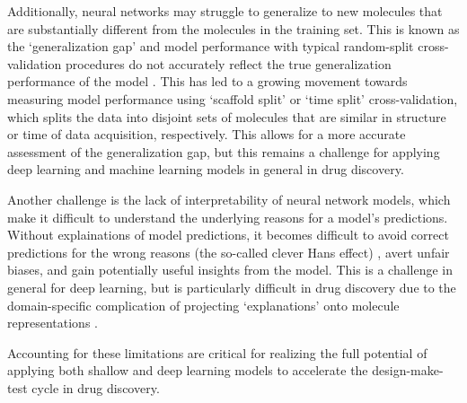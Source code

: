 Additionally, neural networks may struggle to generalize to new molecules that are substantially different from the molecules in the training set. This is known as the `generalization gap' and model performance with typical random-split cross-validation procedures do not accurately reflect the true generalization performance of the model \cite{Sheridan2013TimeSplit}. This has led to a growing movement towards measuring model performance using `scaffold split' \cite{wu2017molnet, yang2019chemprop} or `time split' \cite{Sheridan2013TimeSplit} cross-validation, which splits the data into disjoint sets of molecules that are similar in structure or time of data acquisition, respectively. This allows for a more accurate assessment of the generalization gap, but this remains a challenge for applying deep learning and machine learning models in general in drug discovery.

Another challenge is the lack of interpretability of neural network models, which make it difficult to understand the underlying reasons for a model's predictions. Without explainations of model predictions, it becomes difficult to avoid correct predictions for the wrong reasons (the so-called clever Hans effect) \cite{Lapuschkin2019UnmaskingCleverHans}, avert unfair biases, and gain potentially useful insights from the model. This is a challenge in general for deep learning, but is particularly difficult in drug discovery due to the domain-specific complication of projecting `explanations' onto molecule representations \cite{Jimenze2020XAI}.

Accounting for these limitations are critical for realizing the full potential of applying both shallow and deep learning models to accelerate the design-make-test cycle in drug discovery.


